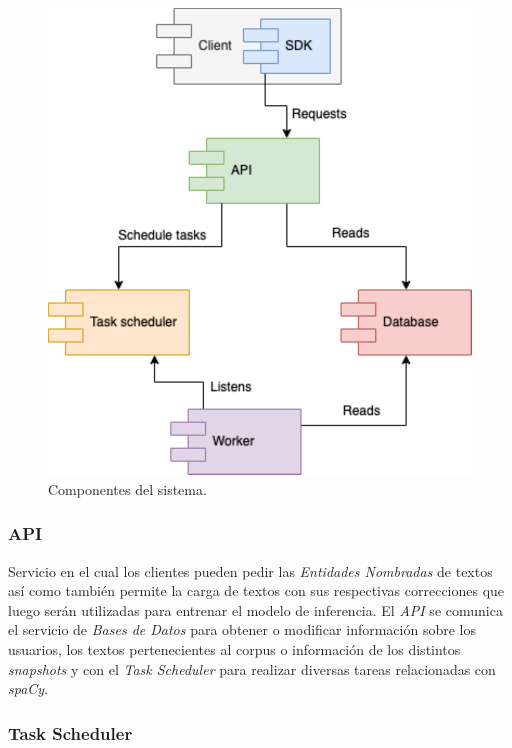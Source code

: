 \documentclass[12pt,a4paper,]{scrartcl}
\begin{document}
\begin{figure}[H]

{\centering \includegraphics{assets/process/process-overview-client.pdf} 

}

\caption{Componentes del sistema.}\label{fig:process-overview-client}
\end{figure}

\hypertarget{api}{%
\subsubsection{API}\label{api}}

Servicio en el cual los clientes pueden pedir las \emph{Entidades Nombradas} de textos así como también permite la carga de textos con sus respectivas correcciones que luego serán utilizadas para entrenar el modelo de inferencia.
El \emph{API} se comunica el servicio de \emph{Bases de Datos} para obtener o modificar información sobre los usuarios, los textos pertenecientes al corpus o información de los distintos \emph{snapshots} y con el \emph{Task Scheduler} para realizar diversas tareas relacionadas con \emph{spaCy}.

\hypertarget{task-scheduler}{%
\subsubsection{Task Scheduler}\label{task-scheduler}}
\end{document}
